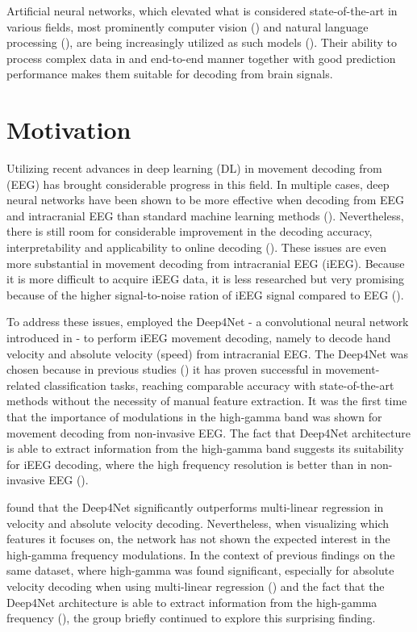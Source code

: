 Artificial neural networks, which elevated what is considered state-of-the-art  in various fields, most prominently computer vision (\cite{dnn-computer-vision}) and natural language processing (\cite{dnn-nlp}), are being increasingly utilized as such models (\cite{Roy-2019}). 
Their ability to process complex data in and end-to-end manner together with good prediction performance makes them suitable for decoding from brain signals. 


\section*{Motivation}
Utilizing recent advances in deep learning (DL) in movement decoding from (EEG) has brought considerable progress in this field.
In multiple cases, deep neural networks have been shown to be more effective when decoding from EEG and intracranial EEG than standard machine learning methods (\cite{Zhang-2019, lawhern-eegnet-2018, sleep-eegnet}).
Nevertheless, there is still room for considerable improvement in the decoding accuracy, interpretability and applicability to online decoding (\cite{Roy-2019}). 
These issues are even more substantial in movement decoding from intracranial EEG (iEEG). 
Because it is more difficult to acquire iEEG data, it is less researched but very promising because of the higher signal-to-noise ration of iEEG signal compared to EEG (\cite{volkova-review}). 

To address these issues, \cite{Hammer-2021} employed the Deep4Net - a convolutional neural network introduced in \cite{schirrmeister-deep-2017} - to perform iEEG movement decoding, namely to decode hand velocity and absolute velocity (speed) from intracranial EEG. 
The Deep4Net was chosen because in previous studies (\cite{schirrmeister-deep-2017, hartmann-hierarchical-2018}) it has proven successful in movement-related classification tasks, reaching comparable accuracy with state-of-the-art methods without the necessity of manual feature extraction.
It was the first time that the importance of modulations in the high-gamma band was shown for movement decoding from non-invasive EEG.
The fact that Deep4Net architecture is able to extract information from the high-gamma band suggests its suitability for iEEG decoding, where the high frequency resolution is better than in non-invasive EEG (\cite{gamma-eeg-bad-resolution}). 

\cite{Hammer-2021} found that the Deep4Net significantly outperforms multi-linear regression in velocity and absolute velocity decoding.
Nevertheless, when visualizing which features it focuses on, the network has not shown the expected interest in the high-gamma frequency modulations. 
In the context of previous findings on the same dataset, where high-gamma was found significant, especially for absolute velocity decoding when using multi-linear regression (\cite{hammer-predominance-2016}) and the fact that the Deep4Net architecture is able to extract information from the high-gamma frequency (\cite{schirrmeister-deep-2017}), the group briefly continued to explore this surprising finding.

